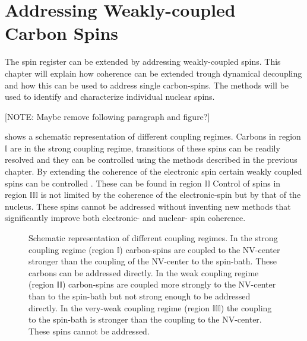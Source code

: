 
\chapter{Addressing Weakly-coupled Carbon Spins}
\label{chap:addressing_weakly_coupled_carbons}

The spin register can be extended by addressing weakly-coupled spins.
This chapter will explain how coherence can be extended trough dynamical decoupling and how this can be used to address single carbon-spins.
The methods will be used to identify and characterize individual nuclear spins.

[NOTE: Maybe remove following paragraph and figure?]

 shows a schematic representation of different coupling regimes.
Carbons in region $\mathbb{I} $ are in the strong coupling regime, transitions of these spins can be readily resolved and they can be controlled using the methods described in the previous chapter.
By extending the coherence of the electronic spin certain weakly coupled spins can be controlled \citep{Taminiau2012Detection}.
These can be found in region $\mathbb{II}$
Control of spins in region $\mathbb{III}$ is not limited by the coherence of the electronic-spin but by that of the nucleus.
These spins cannot be addressed without inventing new methods that significantly improve both electronic- and nuclear- spin coherence.


\begin{figure}[htbp]
\centering
    \caption{ Schematic representation of different coupling regimes. In the strong coupling regime (region $\mathbb{I}$) carbon-spins are coupled to the NV-center stronger than the coupling of the NV-center to the spin-bath. These carbons can be addressed directly. In the weak coupling regime (region $\mathbb{II}$) carbon-spins are coupled more strongly to the NV-center than to the spin-bath but not strong enough to be addressed directly. In the very-weak coupling regime (region $\mathbb{III}$) the coupling to the spin-bath is stronger than the coupling to the NV-center. These spins cannot be addressed.}
    \label{fig:coupling regimes}
\end{figure}



